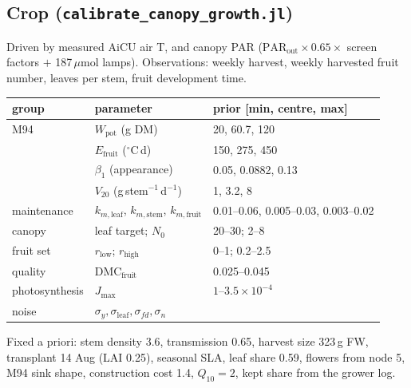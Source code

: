 \documentclass[11pt,a4paper]{article}
\begin{document}
\subsection{Crop (\texttt{calibrate\_canopy\_growth.jl})}
Driven by measured AiCU air T,  and canopy PAR ($\mathrm{PAR}_{\text{out}}\times0.65\times$ screen factors $+$ 187\,$\mu$mol lamps).
Observations: weekly harvest, weekly harvested fruit number, leaves per stem, fruit development time.
\begin{center}\small
\begin{tabular}{lll}
\toprule
group & parameter & prior [min, centre, max]\\
\midrule
M94 & $W_{\text{pot}}$ (g DM) & 20, 60.7, 120\\
 & $E_{\text{fruit}}$ ($^\circ$C\,d) & 150, 275, 450\\
 & $\beta_1$ (appearance) & 0.05, 0.0882, 0.13\\
 & $V_{20}$ (g\,stem$^{-1}$\,d$^{-1}$) & 1, 3.2, 8\\
maintenance & $k_{m,\text{leaf}}$, $k_{m,\text{stem}}$, $k_{m,\text{fruit}}$ & 0.01--0.06, 0.005--0.03, 0.003--0.02\\
canopy & leaf target; $N_0$ & 20--30; 2--8\\
fruit set & $r_{\text{low}}$; $r_{\text{high}}$ & 0--1; 0.2--2.5\\
quality & DMC$_{\text{fruit}}$ & 0.025--0.045\\
photosynthesis & $J_{\max}$ & $1$--$3.5\times10^{-4}$\\
noise & $\sigma_y,\sigma_{\text{leaf}},\sigma_{fd},\sigma_n$ & \\
\bottomrule
\end{tabular}
\end{center}
Fixed a priori: stem density 3.6, transmission 0.65, harvest size 323\,g FW, transplant 14 Aug (LAI 0.25),
seasonal SLA, leaf share 0.59, flowers from node 5, M94 sink shape, construction cost 1.4, $Q_{10}=2$, kept
share from the grower log.
\end{document}

